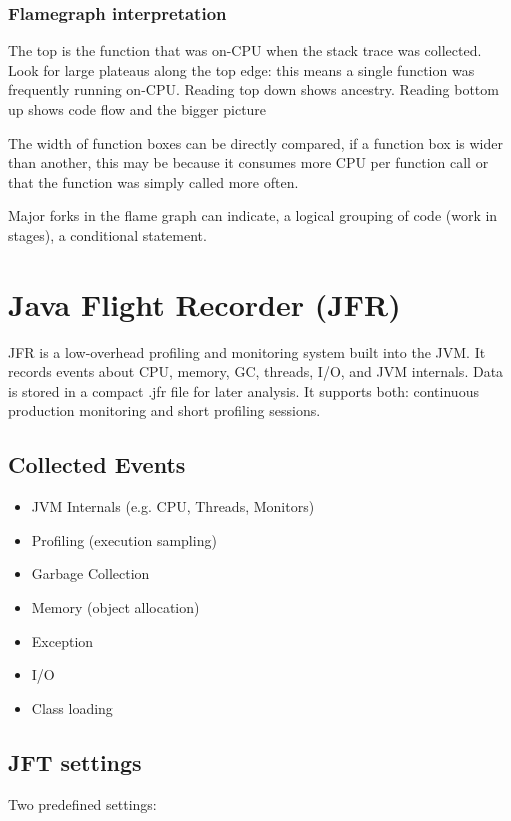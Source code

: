 \subsubsection{Flamegraph interpretation}

The top is the function that was on-CPU when the stack trace was collected.
Look for large plateaus along the top edge: this means a single function was frequently
running on-CPU. Reading top down shows ancestry. Reading bottom up shows code flow and the bigger picture

The width of function boxes can be directly compared, if a function box is wider than another, this may be because it consumes more CPU
per function call or that the function was simply called more often.

Major forks in the flame graph can indicate, a logical grouping of code (work in stages), a conditional statement.

\section{Java Flight Recorder (JFR)}
JFR is a low-overhead profiling and monitoring system built
into the JVM. It records events about CPU, memory, GC, threads, I/O, and
JVM internals. Data is stored in a compact .jfr file for later analysis.
It supports both: continuous production monitoring and short profiling sessions.

\subsection{Collected Events}

\begin{itemize}
  \item JVM Internals (e.g. CPU, Threads, Monitors)
  \item Profiling (execution sampling)
  \item Garbage Collection
  \item Memory (object allocation)
  \item Exception
  \item I/O
  \item Class loading
\end{itemize}

\subsection{JFT settings}
Two predefined settings:

